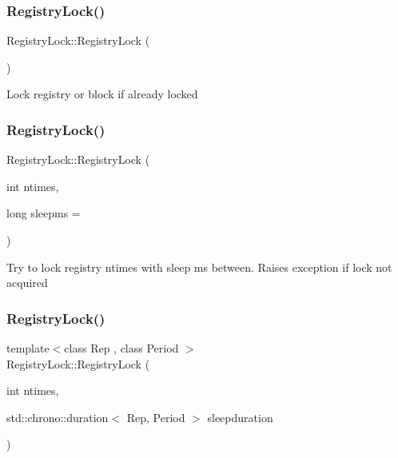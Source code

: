 \subsubsection{\texorpdfstring{Registry\+Lock()}{RegistryLock()}\hspace{0.1cm}{\footnotesize\ttfamily [1/3]}}
{\footnotesize\ttfamily Registry\+Lock\+::\+Registry\+Lock (\begin{DoxyParamCaption}{ }\end{DoxyParamCaption})}

Lock registry or block if already locked \mbox{\label{structtheoria_1_1core_1_1RegistryLock_a207ca3d063dd8aa9864a69c8bfc7d37d}} 
\subsubsection{\texorpdfstring{Registry\+Lock()}{RegistryLock()}\hspace{0.1cm}{\footnotesize\ttfamily [2/3]}}
{\footnotesize\ttfamily Registry\+Lock\+::\+Registry\+Lock (\begin{DoxyParamCaption}\item[{int}]{ntimes,  }\item[{long}]{sleepms = {} }\end{DoxyParamCaption})}

Try to lock registry ntimes with sleep ms between. Raises exception if lock not acquired \mbox{\label{structtheoria_1_1core_1_1RegistryLock_a125ee48beb0368158dc4a38716196d5c}} 
\subsubsection{\texorpdfstring{Registry\+Lock()}{RegistryLock()}\hspace{0.1cm}{\footnotesize\ttfamily [3/3]}}
{\footnotesize\ttfamily template$<$class Rep , class Period $>$ \\
Registry\+Lock\+::\+Registry\+Lock (\begin{DoxyParamCaption}\item[{int}]{ntimes,  }\item[{std\+::chrono\+::duration$<$ Rep, Period $>$}]{sleepduration }\end{DoxyParamCaption})}

